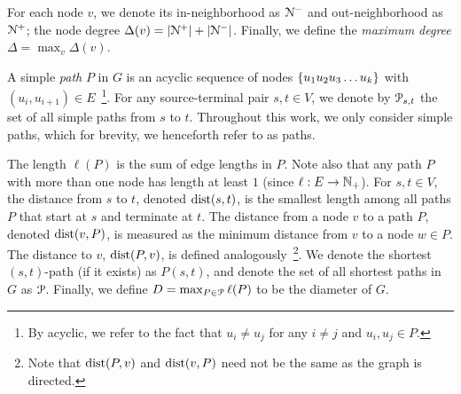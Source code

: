 
For each node $v$, we denote its in-neighborhood as $\Nb$ and out-neighborhood as $\Nf$; the node degree $\Delta(v) = |\Nf|+|\Nb|$.
Finally, we define the \emph{maximum degree} $\Delta = \max_v\Delta(v)$.


A simple \emph{path} $P$ in $G$ is an acyclic sequence of nodes  $\crl*{u_1u_2u_3\ldots u_k}$ with $(u_i,u_{i+1})\in E$~\footnote{By acyclic, we refer to the fact that $u_i\neq u_j$ for any $i\neq j$ and $u_i,u_j\in P$.}. 
For any source-terminal pair $s,t\in V$, we denote by $\calP_{s,t}$ the set of all simple paths from $s$ to $t$.
Throughout this work, we only consider simple paths, which for brevity, we henceforth refer to as paths.

The length $\ell(P)$ is the sum of edge lengths in $P$. Note also that any path $P$ with more than one node has length at least $1$ (since $\ell:E\to \N_+$).
For $s,t\in V$, the distance from $s$ to $t$, denoted $\dist(s,t)$, is the smallest length among all paths $P$ that start at $s$ and terminate at $t$.
The distance from a node $v$ to a path $P$, denoted $\dist(v,P)$, is measured as the minimum distance from $v$ to a node $w\in P$.
The distance to $v$, $\dist(P,v)$, is defined analogously~\footnote{Note that  $\dist(P,v)$ and  $\dist(v,P)$ need not be the same as the graph is directed.}.
We denote the shortest $(s,t)$-path (if it exists) as $P(s,t)$, and denote the set of all shortest paths in $G$ as $\calP$.
Finally, we define $D=\max_{P\in\calP}\ell(P)$ to be the diameter of $G$.



